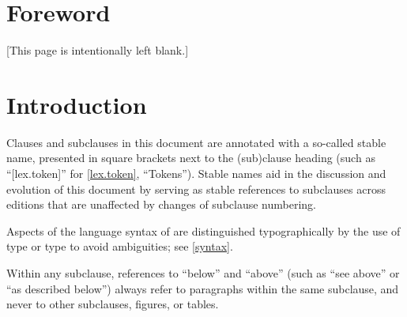 
\chapter{Foreword}

[This page is intentionally left blank.]

\chapter{Introduction}

Clauses and subclauses in this document are annotated
with a so-called stable name,
presented in square brackets next to the (sub)clause heading
(such as ``[lex.token]'' for \ref{lex.token}, ``Tokens'').
Stable names aid in the discussion and evolution of this document
by serving as stable references to subclauses across editions
that are unaffected by changes of subclause numbering.

Aspects of the language syntax of \Cpp{} are distinguished typographically
by the use of  type
or  type to avoid ambiguities; see \ref{syntax}.

Within any subclause, references to ``below'' and ``above''
(such as ``see above'' or ``as described below'')
always refer to paragraphs within the same subclause,
and never to other subclauses, figures, or tables.
